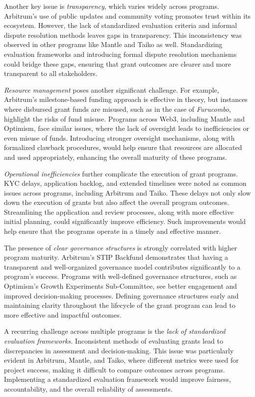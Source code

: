 \documentclass[a4,10pt]{article}
\begin{document}
Another key issue is \textit{transparency}, which varies widely across programs. Arbitrum’s use of public updates and community voting promotes trust within its ecosystem. However, the lack of standardized evaluation criteria and informal dispute resolution methods leaves gaps in transparency. This inconsistency was observed in other programs like Mantle and Taiko as well. Standardizing evaluation frameworks and introducing formal dispute resolution mechanisms could bridge these gaps, ensuring that grant outcomes are clearer and more transparent to all stakeholders.

\textit{Resource management} poses another significant challenge. For example, Arbitrum's milestone-based funding approach is effective in theory, but instances where disbursed grant funds are misused, such as in the case of \textit{Furucombo}, highlight the risks of fund misuse. Programs across Web3, including Mantle and Optimism, face similar issues, where the lack of oversight leads to inefficiencies or even misuse of funds. Introducing stronger oversight mechanisms, along with formalized clawback procedures, would help ensure that resources are allocated and used appropriately, enhancing the overall maturity of these programs.

\textit{Operational inefficiencies} further complicate the execution of grant programs. KYC delays, application backlog, and extended timelines were noted as common issues across programs, including Arbitrum and Taiko. These delays not only slow down the execution of grants but also affect the overall program outcomes. Streamlining the application and review processes, along with more effective initial planning, could significantly improve efficiency. Such improvements would help ensure that the programs operate in a timely and effective manner.

The presence of \textit{clear governance structures} is strongly correlated with higher program maturity. Arbitrum’s STIP Backfund demonstrates that having a transparent and well-organized governance model contributes significantly to a program’s success. Programs with well-defined governance structures, such as Optimism’s Growth Experiments Sub-Committee, see better engagement and improved decision-making processes. Defining governance structures early and maintaining clarity throughout the lifecycle of the grant program can lead to more effective and impactful outcomes.

A recurring challenge across multiple programs is the \textit{lack of standardized evaluation frameworks}. Inconsistent methods of evaluating grants lead to discrepancies in assessment and decision-making. This issue was particularly evident in Arbitrum, Mantle, and Taiko, where different metrics were used for project success, making it difficult to compare outcomes across programs. Implementing a standardized evaluation framework would improve fairness, accountability, and the overall reliability of assessments.
\end{document}
